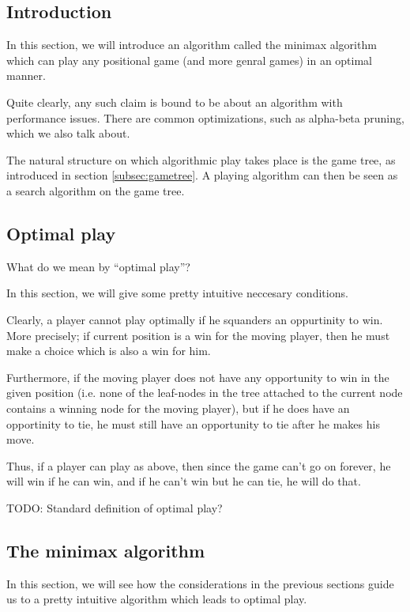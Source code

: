 \subsection{Introduction}

In this section, we will introduce an algorithm called the minimax algorithm which can play any positional game (and more genral games) in an optimal manner.

Quite clearly, any such claim is bound to be about an algorithm with performance issues.
There are common optimizations, such as alpha-beta pruning, which we also talk about.

The natural structure on which algorithmic play takes place is the game tree, as introduced in section \ref{subsec:gametree}.
A playing algorithm can then be seen as a search algorithm on the game tree.


\subsection{Optimal play}

What do we mean by ``optimal play''?

In this section, we will give some pretty intuitive neccesary conditions.

Clearly, a player cannot play optimally if he squanders an oppurtinity to win.
More precisely; if current position is a win for the moving player, then he must make a choice which is also a win for him.

Furthermore, if the moving player does not have any opportunity to win in the given position (i.e. none of the leaf-nodes in the tree attached to the current node contains a winning node for the moving player), but if he does have an opportinity to tie, he must still have an opportunity to tie after he makes his move.

Thus, if a player can play as above, then since the game can't go on forever, he will win if he can win, and if he can't win but he can tie, he will do that.


TODO: Standard definition of optimal play?


\subsection{The minimax algorithm}

In this section, we will see how the considerations in the previous sections guide us to a pretty intuitive algorithm which leads to optimal play.

